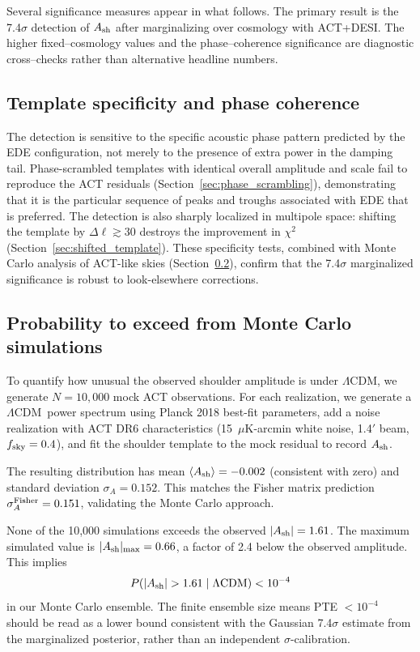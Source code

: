\documentclass[onecolumn,showpacs,preprintnumbers,amsmath,amssymb,prd]{revtex4-2}
\newcommand{\lcdm}{$\Lambda$CDM}
\begin{document}
Several significance measures appear in what follows. The primary result is the 7.4$\sigma$ 
detection of $A_{\rm sh}$ after marginalizing over cosmology with ACT+DESI. The higher 
fixed--cosmology values and the phase--coherence significance are diagnostic cross--checks 
rather than alternative headline numbers.

\subsection{Template specificity and phase coherence}

The detection is sensitive to the specific acoustic phase pattern predicted 
by the EDE configuration, not merely to the presence of extra power in the 
damping tail. Phase-scrambled templates with identical overall amplitude and 
scale fail to reproduce the ACT residuals (Section~\ref{sec:phase_scrambling}), 
demonstrating that it is the particular sequence of peaks and troughs 
associated with EDE that is preferred. The detection is also sharply 
localized in multipole space: shifting the template by $\Delta\ell \gtrsim 30$ 
destroys the improvement in $\chi^2$ (Section~\ref{sec:shifted_template}). 
These specificity tests, combined with Monte Carlo analysis of ACT-like skies 
(Section~\ref{sec:pte}), confirm that the 7.4$\sigma$ marginalized significance 
is robust to look-elsewhere corrections.

\subsection{Probability to exceed from Monte Carlo simulations}
\label{sec:pte}

To quantify how unusual the observed shoulder amplitude is under \lcdm, we 
generate $N = 10{,}000$ mock ACT observations. For each realization, we generate a \lcdm\ power spectrum using Planck 2018 best-fit parameters, add a noise realization with ACT DR6 characteristics (15~$\mu$K-arcmin white noise, 1.4$'$ beam, $f_{\rm sky} = 0.4$), and fit the shoulder template to the mock residual to record $A_{\rm sh}$.

The resulting distribution has mean $\langle A_{\rm sh}\rangle = -0.002$ 
(consistent with zero) and standard deviation $\sigma_A = 0.152$. This matches 
the Fisher matrix prediction $\sigma_A^{\rm Fisher} = 0.151$, validating the 
Monte Carlo approach.

None of the 10,000 simulations exceeds the observed $|A_{\rm sh}| = 1.61$. 
The maximum simulated value is $|A_{\rm sh}|_{\rm max} = 0.66$, a factor of 
2.4 below the observed amplitude. This implies
\begin{equation}
  P(|A_{\rm sh}| > 1.61 \mid \Lambda\text{CDM}) < 10^{-4}
\end{equation}
in our Monte Carlo ensemble. The finite ensemble size means PTE $< 10^{-4}$ 
should be read as a lower bound consistent with the Gaussian 7.4$\sigma$ 
estimate from the marginalized posterior, rather than an independent 
$\sigma$-calibration.
\end{document}
